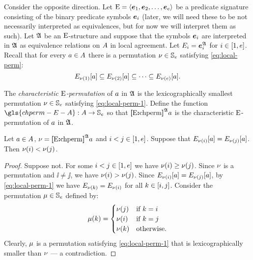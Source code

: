 Consider the opposite direction.
Let ${\mathrm{E}} = \left\langle \bm{e}_{1},\bm{e}_{2},\dots,\bm{e}_{e} \right\rangle$ be a predicate signature consisting
of the binary predicate symbols $\bm{e}_{i}$ (later, we will need these to be
not necessarily interpreted as equivalences, but for now we will interpret
them as such).
Let $\mathfrak{A}$ be an ${\mathrm{E}}$-structure and suppose that the symbols $\bm{e}_{i}$ are
interpreted in $\mathfrak{A}$ as equivalence relations on $A$ in local agreement.
Let $E_{i} = \bm{e}_{i}^{\mathfrak{A}}$ for $i \in [1,e]$.
Recall that for every $a \in A$ there is a permutation
$\nu \in \mathbb{S}_{e}$ satisfying \cref{eq:local-perm}:
\begin{equation}\label{eq:local-perm-1}
  \relEE{\permnu(1)}[\ea] \subseteq
  \relEE{\permnu(2)}[\ea] \subseteq \dots \subseteq
  \relEE{\permnu(\sze)}[\ea].
\end{equation}
\begin{definition}
The \emph{characteristic ${\mathrm{E}}$-permutation} of $a$ in $\mathfrak{A}$ is
the lexicographically smallest permutation $\nu \in \mathbb{S}_{e}$
satisfying \cref{eq:local-perm-1}.
Define the function $\gls{chperm-E-A} : \domA \to \Perms\sze$ so
that ${\bm{[}{\mathrm{E}}\mathord{\bm{:}}\mathrm{chperm}\bm{]}}^{\mathfrak{A}}a$ is the characteristic ${\mathrm{E}}$-permutation of $a$ in
$\mathfrak{A}$.
\end{definition}
\begin{remark}\label{rem:local-eq-perm}
Let $a \in A$, $\nu = {\bm{[}{\mathrm{E}}\mathord{\bm{:}}\mathrm{chperm}\bm{]}}^{\mathfrak{A}}a$ and
$i < j \in [1,e]$.
Suppose that $E_{\nu(i)}[a] = E_{\nu(j)}[a]$.
Then $\nu(i) < \nu(j)$.
\end{remark}
\begin{proof}
Suppose not. For some $i < j \in [1,e]$ we have
$\nu(i) \geq \nu(j)$.
Since $\nu$ is a permutation and $\ii \neq \jj$,
we have $\nu(i) > \nu(j)$.
Since $E_{\nu(i)}[a] = E_{\nu(j)}[a]$,
by \cref{eq:local-perm-1} we have $E_{\nu(k)} = E_{\nu(i)}$
for all $k \in [i, j]$.
Consider the permutation $\mu \in \mathbb{S}_{e}$ defined by:
\[
  \mu(k) = \begin{cases}
    \nu(j) &\text{if } k = i \\
    \nu(i) &\text{if } k = j \\
    \nu(k) &\text{otherwise.}
  \end{cases}
\]
Clearly, $\mu$ is a permutation satisfying \cref{eq:local-perm-1} that is
lexicographically smaller than $\nu$ --- a contradiction.
\end{proof}

